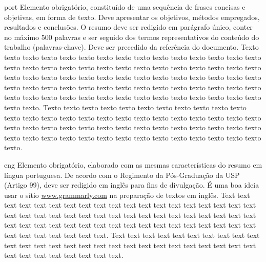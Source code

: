 


\begin{resumo}{port}
    Elemento obrigatório, constituído de uma sequência de frases concisas e
    objetivas, em forma de texto.  Deve apresentar os objetivos, métodos empregados,
    resultados e conclusões.  O resumo deve ser redigido em parágrafo único, conter
    no máximo 500 palavras e ser seguido dos termos representativos do conteúdo do
    trabalho (palavras-chave). Deve ser precedido da referência do documento.
    Texto texto texto texto texto texto texto texto texto texto texto texto texto
    texto texto texto texto texto texto texto texto texto texto texto texto texto
    texto texto texto texto texto texto texto texto texto texto texto texto texto
    texto texto texto texto texto texto texto texto texto texto texto texto texto
    texto texto texto texto texto texto texto texto texto texto texto texto texto
    texto texto texto texto texto texto texto texto.
    Texto texto texto texto texto texto texto texto texto texto texto texto texto
    texto texto texto texto texto texto texto texto texto texto texto texto texto
    texto texto texto texto texto texto texto texto texto texto texto texto texto
    texto texto texto texto texto texto texto texto texto texto texto texto texto
    texto texto.
    \end{resumo}
    
    \begin{resumo}{eng}
    Elemento obrigatório, elaborado com as mesmas características do resumo em
    língua portuguesa. De acordo com o Regimento da Pós-Graduação da USP (Artigo
    99), deve ser redigido em inglês para fins de divulgação. É uma boa ideia usar
    o sítio \url{www.grammarly.com} na preparação de textos em inglês.
    Text text text text text text text text text text text text text text text text
    text text text text text text text text text text text text text text text text
    text text text text text text text text text text text text text text text text
    text text text text text text text text text text text text.
    Text text text text text text text text text text text text text text text text
    text text text text text text text text text text text text text text text text
    text text text.
    \end{resumo}
    

